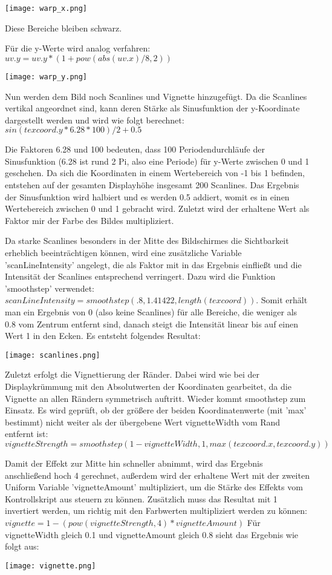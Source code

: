 \texttt{[image: warp\_x.png]}

Diese Bereiche bleiben schwarz.

Für die y-Werte wird analog verfahren: $uv.y = uv.y * (1 + pow(abs(uv.x) / 8, 2))$

\texttt{[image: warp\_y.png]}

Nun werden dem Bild noch Scanlines und Vignette hinzugefügt. Da die Scanlines vertikal angeordnet sind, kann deren Stärke als Sinusfunktion der y-Koordinate dargestellt werden und wird wie folgt berechnet: $sin(texcoord.y * 6.28 * 100) / 2 + 0.5$ 

Die Faktoren 6.28 und 100 bedeuten, dass 100 Periodendurchläufe der Sinusfunktion (6.28 ist rund 2 Pi, also eine Periode) für y-Werte zwischen 0 und 1 geschehen. Da sich die Koordinaten in einem Wertebereich von -1 bis 1 befinden, entstehen auf der gesamten Displayhöhe insgesamt 200 Scanlines. Das Ergebnis der Sinusfunktion wird halbiert und es werden 0.5 addiert, womit es in einen Wertebereich zwischen 0 und 1 gebracht wird. Zuletzt wird der erhaltene Wert als Faktor mir der Farbe des Bildes multipliziert. 

Da starke Scanlines besonders in der Mitte des Bildschirmes die Sichtbarkeit erheblich beeinträchtigen können, wird eine zusätzliche Variable 'scanLineIntensity' angelegt, die als Faktor mit in das Ergebnis einflie{\ss}t und die Intensität der Scanlines entsprechend verringert. Dazu wird die Funktion 'smoothstep' verwendet: $scanLineIntensity = smoothstep(.8, 1.41422, length(texcoord))$. Somit erhält man ein Ergebnis von 0 (also keine Scanlines) für alle Bereiche, die weniger als 0.8 vom Zentrum entfernt sind, danach steigt die Intensität linear bis auf einen Wert 1 in den Ecken. Es entsteht folgendes Resultat:

\texttt{[image: scanlines.png]}

Zuletzt erfolgt die Vignettierung der Ränder. Dabei wird wie bei der Displaykrümmung mit den Absolutwerten der Koordinaten gearbeitet, da die Vignette an allen Rändern symmetrisch auftritt. Wieder kommt smoothstep zum Einsatz. Es wird geprüft, ob der grö{\ss}ere der beiden Koordinatenwerte (mit 'max' bestimmt) nicht weiter als der übergebene Wert vignetteWidth vom Rand entfernt ist: $vignetteStrength = smoothstep(1 - vignetteWidth, 1, max(texcoord.x, texcoord.y))$

Damit der Effekt zur Mitte hin schneller abnimmt, wird das Ergebnis anschlie{\ss}end hoch 4 gerechnet, au{\ss}erdem wird der erhaltene Wert mit der zweiten Uniform Variable 'vignetteAmount' multipliziert, um die Stärke des Effekts vom Kontrollskript aus steuern zu können. Zusätzlich muss das Resultat mit 1 invertiert werden, um richtig mit den Farbwerten multipliziert werden zu können: $vignette = 1 - (pow(vignetteStrength, 4) * vignetteAmount)$
Für vignetteWidth gleich 0.1 und vignetteAmount gleich 0.8 sieht das Ergebnis wie folgt aus:

\texttt{[image: vignette.png]}

